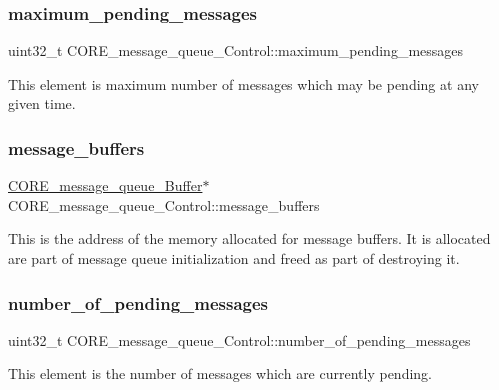 \subsubsection{\texorpdfstring{maximum\_pending\_messages}{maximum\_pending\_messages}}
{\footnotesize\ttfamily uint32\+\_\+t C\+O\+R\+E\+\_\+message\+\_\+queue\+\_\+\+Control\+::maximum\+\_\+pending\+\_\+messages}

This element is maximum number of messages which may be pending at any given time. \mbox{\label{structCORE__message__queue__Control_ab2aa8d674efa7896c16efccef4806910}} 
\subsubsection{\texorpdfstring{message\_buffers}{message\_buffers}}
{\footnotesize\ttfamily \mbox{\hyperlink{structCORE__message__queue__Buffer}{C\+O\+R\+E\+\_\+message\+\_\+queue\+\_\+\+Buffer}}$\ast$ C\+O\+R\+E\+\_\+message\+\_\+queue\+\_\+\+Control\+::message\+\_\+buffers}

This is the address of the memory allocated for message buffers. It is allocated are part of message queue initialization and freed as part of destroying it. \mbox{\label{structCORE__message__queue__Control_a8165e207a6213cfb3c3aa2198253a5ec}} 
\subsubsection{\texorpdfstring{number\_of\_pending\_messages}{number\_of\_pending\_messages}}
{\footnotesize\ttfamily uint32\+\_\+t C\+O\+R\+E\+\_\+message\+\_\+queue\+\_\+\+Control\+::number\+\_\+of\+\_\+pending\+\_\+messages}

This element is the number of messages which are currently pending. \mbox{\label{structCORE__message__queue__Control_ac34a2906ce33b149caf25015d596fb27}} 
